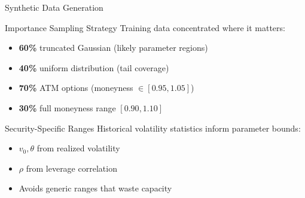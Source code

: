 \documentclass{beamer}
\begin{document}
\begin{frame}{Synthetic Data Generation}
    \begin{block}{Importance Sampling Strategy}
        Training data concentrated where it matters:
        \begin{itemize}
            \item \textbf{60\%} truncated Gaussian (likely parameter regions)
            \item \textbf{40\%} uniform distribution (tail coverage)
            \item \textbf{70\%} ATM options (moneyness $\in [0.95, 1.05]$)
            \item \textbf{30\%} full moneyness range $[0.90, 1.10]$
        \end{itemize}
    \end{block}

    \vspace{0.3cm}

    \begin{block}{Security-Specific Ranges}
        Historical volatility statistics inform parameter bounds:
        \begin{itemize}
            \item $v_0, \theta$ from realized volatility
            \item $\rho$ from leverage correlation
            \item Avoids generic ranges that waste capacity
        \end{itemize}
    \end{block}
\end{frame}
\end{document}
